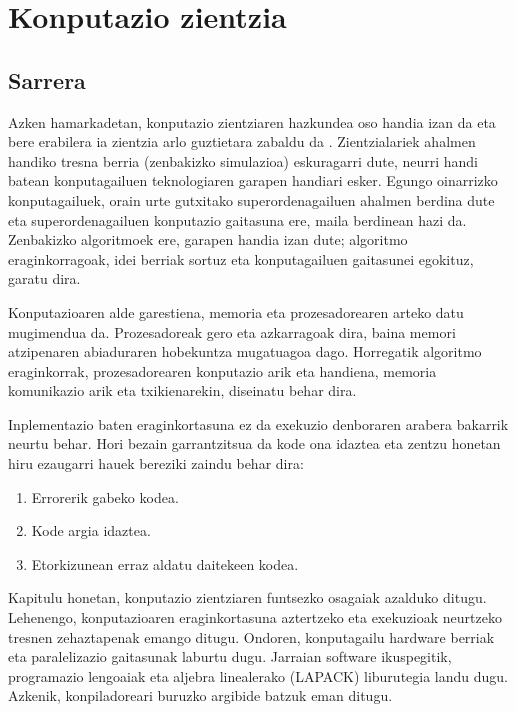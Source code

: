 \chapter{Konputazio zientzia}


\section{Sarrera}

Azken hamarkadetan,  konputazio zientziaren hazkundea oso handia izan da eta bere erabilera ia zientzia arlo guztietara zabaldu da \cite{Goedecker2001}. Zientzialariek ahalmen handiko tresna berria (zenbakizko simulazioa) eskuragarri dute, neurri handi batean konputagailuen teknologiaren garapen handiari esker. Egungo oinarrizko konputagailuek, orain urte gutxitako superordenagailuen ahalmen berdina dute eta superordenagailuen konputazio gaitasuna ere, maila berdinean hazi da. Zenbakizko algoritmoek ere, garapen handia izan dute; algoritmo eraginkorragoak, idei berriak sortuz eta konputagailuen gaitasunei egokituz, garatu dira.

Konputazioaren alde garestiena, memoria eta prozesadorearen arteko datu mugimendua da. Prozesadoreak gero eta azkarragoak dira, baina memori atzipenaren abiaduraren hobekuntza mugatuagoa dago. Horregatik algoritmo eraginkorrak, prozesadorearen konputazio arik eta handiena,  memoria komunikazio arik eta txikienarekin, diseinatu behar dira.      
 
Inplementazio baten eraginkortasuna ez da exekuzio denboraren arabera bakarrik neurtu behar. Hori bezain garrantzitsua da kode ona idaztea \cite{Wilson2014} eta zentzu honetan hiru ezaugarri hauek bereziki zaindu behar dira:
\begin{enumerate}
\item Errorerik gabeko kodea.
\item Kode argia idaztea.
\item Etorkizunean erraz aldatu daitekeen kodea.
\end{enumerate}

Kapitulu honetan,  konputazio zientziaren funtsezko osagaiak azalduko ditugu. Lehenengo, konputazioaren eraginkortasuna aztertzeko eta exekuzioak neurtzeko tresnen zehaztapenak emango ditugu. Ondoren, konputagailu hardware berriak eta paralelizazio gaitasunak laburtu dugu. Jarraian software ikuspegitik, programazio lengoaiak eta aljebra linealerako (LAPACK) liburutegia landu dugu. Azkenik, konpiladoreari buruzko argibide batzuk eman ditugu.

